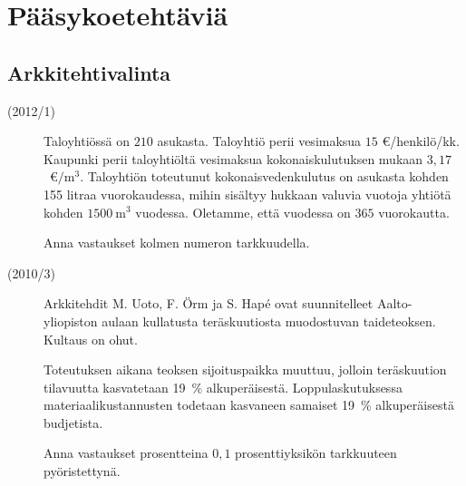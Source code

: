 \section{Pääsykoetehtäviä}

\subsection*{Arkkitehtivalinta}

\begin{description}
    \item[(2012/1)] Taloyhtiössä on $210$ asukasta. Taloyhtiö perii vesimaksua
        $15$ \euro/henkilö/kk. Kaupunki perii taloyhtiöltä vesimaksua
        kokonaiskulutuksen mukaan $3,17$~\euro $/ \mathrm{m}^3$.
        Taloyhtiön toteutunut kokonaisvedenkulutus on asukasta kohden
        155 litraa vuorokaudessa, mihin sisältyy hukkaan valuvia
        vuotoja yhtiötä kohden $1500~\mathrm{m}^3$ vuodessa. Oletamme,
        että vuodessa on $365$ vuorokautta.
                    
    \begin{alakohdat}
    \end{alakohdat}
    
    Anna vastaukset kolmen numeron tarkkuudella.
\end{description}


\begin{description}
    \item[(2010/3)] Arkkitehdit M. Uoto, F. Örm ja S. Hapé ovat suunnitelleet Aalto-yliopiston aulaan kullatusta teräskuutiosta muodostuvan taideteoksen. Kultaus on ohut.
    
    Toteutuksen aikana teoksen sijoituspaikka muuttuu, jolloin teräskuution tilavuutta kasvatetaan 19~\% alkuperäisestä. Loppulaskutuksessa materiaalikustannusten todetaan kasvaneen samaiset 19~\% alkuperäisestä budjetista.                   
    \begin{alakohdat}
    \end{alakohdat}
    
    Anna vastaukset prosentteina $0,1$ prosenttiyksikön tarkkuuteen pyöristettynä.
\end{description}

